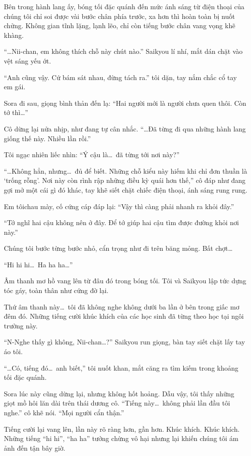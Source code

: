 \documentclass[../main.tex]{subfiles}
\begin{document}
Bên trong hành lang ấy, bóng tối đặc quánh đến mức ánh sáng từ điện thoại của chúng tôi chỉ soi được vài bước chân phía trước, xa hơn thì hoàn toàn bị nuốt chửng. Không gian tĩnh lặng, lạnh lẽo, chỉ còn tiếng bước chân vang vọng khẽ khàng.

``\dots Nii-chan, em không thích chỗ này chút nào.'' Saikyou lí nhí, mắt dán chặt vào vệt sáng yếu ớt.

``Anh cũng vậy. Cứ bám sát nhau, đừng tách ra.'' tôi dặn, tay nắm chắc cổ tay em gái.

Sora đi sau, giọng bình thản đến lạ: ``Hai người mới là người chưa quen thôi. Còn tớ thì\dots''

Cô dừng lại nửa nhịp, như đang tự cân nhắc. ``\dots Đã từng đi qua những hành lang giống thế này. Nhiều lần rồi.''

Tôi ngạc nhiên liếc nhìn: ``Ý cậu là\dots\ đã từng tới nơi này?''

``\dots Không hẳn, nhưng\dots\ đủ để biết. Những chỗ kiểu này hiếm khi chỉ đơn thuần là `trống rỗng'. Nơi này còn rình rập những điều kỳ quái hơn thế,'' cô đáp như đang gợi mở một cái gì đó khác, tay khẽ siết chặt chiếc điện thoại, ánh sáng rung rung.

Em tôichau mày, cố cứng cáp đáp lại: ``Vậy thì càng phải nhanh ra khỏi đây.''

``Tớ nghĩ hai cậu không nên ở đây. Để tớ giúp hai cậu tìm được đường khỏi nơi này.''

Chúng tôi bước từng bước nhỏ, cẩn trọng như đi trên băng mỏng. Bất chợt\dots

``Hi hi hi\dots\ Ha ha ha\dots''

Âm thanh mơ hồ vang lên từ đâu đó trong bóng tối. Tôi và Saikyou lập tức dựng tóc gáy, toàn thân như cứng đờ lại.

Thứ âm thanh này\dots\ tôi đã không nghe không dưới ba lần ở bên trong giấc mơ đêm đó. Những tiếng cười khúc khích của các học sinh đã từng theo học tại ngôi trường này.

``N-Nghe thấy gì không, Nii-chan\dots?'' Saikyou run giọng, bàn tay siết chặt lấy tay áo tôi.

``\dots Có, tiếng đó\dots\ anh biết,'' tôi nuốt khan, mắt căng ra tìm kiếm trong khoảng tối đặc quánh.

Sora lúc này cũng dừng lại, nhưng không hốt hoảng. Dẫu vậy, tôi thấy những giọt mồ hôi lăn dài trên thái dương cô. ``Tiếng này\dots\ không phải lần đầu tôi nghe.'' cô khẽ nói. ``Mọi người cẩn thận.''

Tiếng cười lại vang lên, lần này rõ ràng hơn, gần hơn. Khúc khích. Khúc khích. Những tiếng ``hi hi'', ``ha ha'' tưởng chừng vô hại nhưng lại khiến chúng tôi ám ảnh đến tận bây giờ.
\end{document}
